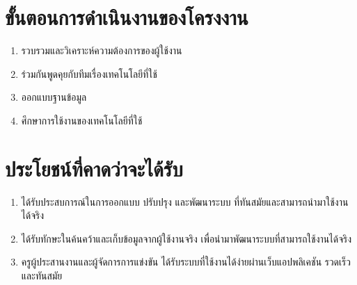 \section{ขั้นตอนการดำเนินงานของโครงงาน}
\begin{enumerate}
    \item รวบรวมและวิเคราะห์ความต้องการของผู้ใช้งาน
    \item ร่วมกันพูดคุยกับทีมเรื่องเทคโนโลยีที่ใช้
    \item ออกแบบฐานข้อมูล
    \item ศึกษาการใช้งานของเทคโนโลยีที่ใช้
\end{enumerate}

\section{ประโยชน์ที่คาดว่าจะได้รับ}
\begin{enumerate}
    \item ได้รับประสบการณ์ในการออกแบบ ปรับปรุง และพัฒนาระบบ ที่ทันสมัยและสามารถนำมาใช้งานได้จริง
    \item ได้รับทักษะในค้นคว้าและเก็บข้อมูลจากผู้ใช้งานจริง เพื่อนำมาพัฒนาระบบที่สามารถใช้งานได้จริง
    \item ครูผู้ประสานงานและผู้จัดการการแข่งขัน ได้รับระบบที่ใช้งานได้ง่ายผ่านเว็บแอปพลิเคชัน รวดเร็ว และทันสมัย
\end{enumerate}
